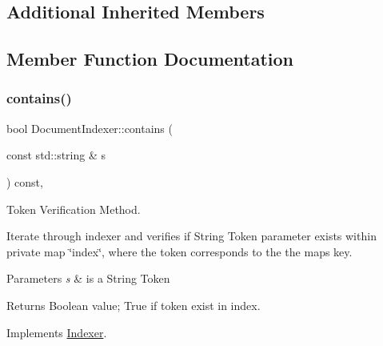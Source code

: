 \subsection*{Additional Inherited Members}


\subsection{Member Function Documentation}
\mbox{\label{class_document_indexer_a4bd5fd7be55de9932933dd6f7bfa7d9f}} 
\subsubsection{\texorpdfstring{contains()}{contains()}}
{\footnotesize\ttfamily bool Document\+Indexer\+::contains (\begin{DoxyParamCaption}\item[{const std\+::string \&}]{s }\end{DoxyParamCaption}) const\hspace{0.3cm}{\ttfamily [override]}, {\ttfamily [virtual]}}



Token Verification Method. 

Iterate through indexer and verifies if String Token parameter exists within private map \char`\"{}index\char`\"{}, where the token corresponds to the the maps key.


\begin{DoxyParams}{Parameters}
{\em s} & is a String Token \\
\hline
\end{DoxyParams}
\begin{DoxyReturn}{Returns}
Boolean value; True if token exist in index. 
\end{DoxyReturn}


Implements \hyperlink{class_indexer_abb847ff86be1ec9265fb53a5ac6f7008}{Indexer}.

\mbox{\label{class_document_indexer_a8738997048b5bfd336f48bade7715cc6}} 
